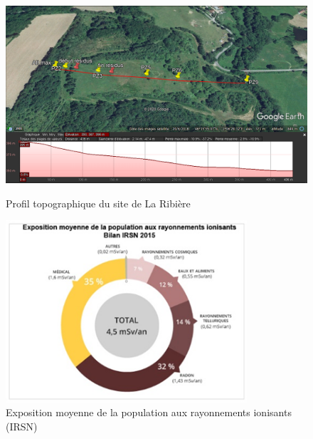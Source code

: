 \documentclass{article}
\begin{document}
\begin{figure}[H]
 \centering
        \includegraphics[width = \textwidth]{plan_coupe_google_earth.png} 
        \label{fig:earth_ribière}
        \caption{Profil topographique du site de La Ribière}
\end{figure}
\begin{figure}[H]
    \centering
    \includegraphics[width=0.8\textwidth]{II_A2_4.png}
    \caption{Exposition moyenne de la population aux rayonnements ionisants (IRSN)}
    \label{fig:exposition_moyenne}
\end{figure}
\end{document}
